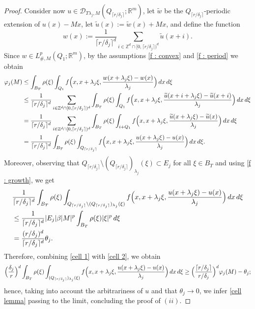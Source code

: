 \documentclass[10pt,a4paper]{amsart}
\newcommand{\R}{\mathbb{R}}
\newcommand{\dej}{\delta_j}
\newcommand{\f}{\varphi}
\begin{document}
\begin{proof}
Consider now $u\in \mathcal{D}_{T\lambda_j,M}(Q_{\lceil r/\dej\rceil};\R^m)$, let $\widetilde{w}$ be the $Q_{\lceil r/\dej\rceil}$-periodic extension of $u(x)-Mx$, let $\widetilde{u}(x):=\widetilde{w}(x)+Mx$, and define the function 
\begin{equation*}
    w(x):=\frac{1}{\lceil r/\dej \rceil^d} \sum_{i\in \mathbb{Z}^d\cap [0,\lceil r/\dej \rceil)^d} \widetilde{u}(x+i).
\end{equation*}
Since $w\in L^p_{\#,M}(Q_1; \R^m)$, by the assumptions \eqref{f : convex} and \eqref{f : period} we obtain
\begin{align} \nonumber
    \f_j(M) & \leq \int_{B_T} \rho(\xi)\int_{Q_1} f\Bigl(x,x+\lambda_j\xi,\frac{w(x+\lambda_j\xi)-w(x)}{\lambda_j}\Bigr)\, dx\,d\xi \\ \nonumber
    & \leq \frac{1}{\lceil r/\dej \rceil^d} \sum_{i\in \mathbb{Z}^d\cap [0,\lceil r/\dej \rceil)^d}  \int_{B_T} \rho(\xi)\int_{Q_1} f\Bigl(x, x+\lambda_j\xi, \frac{\widetilde{u}(x+i+\lambda_j\xi)-\widetilde{u}(x+i)}{\lambda_j}\Bigr)\, dx\,d\xi \\ \nonumber
    & = \frac{1}{\lceil r/\dej \rceil^d} \sum_{i\in \mathbb{Z}^d\cap [0,\lceil r/\dej \rceil)^d}  \int_{B_T} \rho(\xi)\int_{i+Q_1} f\Bigl(x, x+\lambda_j\xi, \frac{\widetilde{u}(x+\lambda_j\xi)-\widetilde{u}(x)}{\lambda_j}\Bigr)\, dx\,d\xi \\ \label{cell 1}
    & = \frac{1}{\lceil r/\dej \rceil^d} \int_{B_T} \rho(\xi)\int_{Q_{\lceil r/\dej\rceil}} f\Bigl(x,x+\lambda_j\xi,\frac{u(x+\lambda_j\xi)-u(x)}{\lambda_j}\Bigr)\, dx\,d\xi.
\end{align}
Moreover, observing that $Q_{\lceil r/\dej\rceil}\setminus (Q_{\lceil r/\dej\rceil})_{\lambda_j}(\xi)\subset E_j$ for all $\xi\in B_T$ and using \eqref{f : growth}, we get 
\begin{align} \nonumber
    & \frac{1}{\lceil r/\dej \rceil^d} \int_{B_T} \rho(\xi)\int_{Q_{\lceil r/\dej\rceil}\setminus (Q_{\lceil r/\dej\rceil})_{\lambda_j}(\xi)} f\Bigl(x, x+\lambda_j\xi,\frac{u(x+\lambda_j\xi)-u(x)}{\lambda_j}\Bigr)\, dx\,d\xi \\ \nonumber
    & \leq \frac{1}{\lceil r/\dej \rceil^d} |E_j| \beta |M|^p\int_{B_T} \rho(\xi)|\xi|^p\, d\xi \\ \label{cell 2}
    & = \frac{(r/\dej)^d}{\lceil r/\dej \rceil^d}  \theta_j.
 \end{align}
Therefore, combining \eqref{cell 1} with \eqref{cell 2}, we obtain
\begin{align*}
  \Bigl(\frac{\dej}{r}\Bigr)^d\int_{B_T} \rho(\xi)\int_{(Q_{\lceil r/\dej\rceil})_{\lambda_j}(\xi)} f\Bigl(x,x+\lambda_j\xi,\frac{u(x+\lambda_j\xi)-u(x)}{\lambda_j}\Bigr)\, dx\,d\xi \geq \Bigl(\frac{\lceil r/\dej \rceil}{r/\dej}\Bigr)^d\f_j(M)-\theta_j;
\end{align*}
hence, taking into account the arbitrariness of $u$ and that $\theta_j\to0$, we infer \eqref{cell lemma} passing to the limit, concluding the proof of $(ii)$.


\end{proof}
\end{document}

